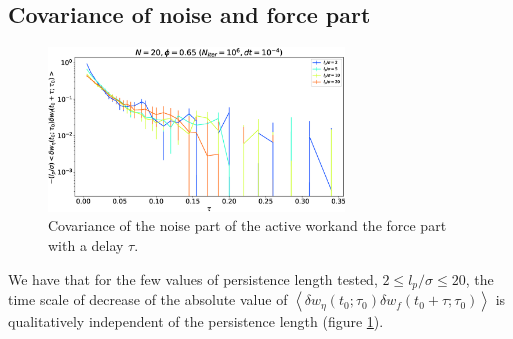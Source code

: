 \documentclass[10pt]{article}
\begin{document}
\subsection{Covariance of noise and force part}

\begin{figure}[H]
\centering
\includegraphics[width=0.7\textwidth]{crossCorNoiseForce_No1000_Dk6500_Em2000.eps}
\caption{Covariance of the noise part of the active workand the force part with a delay $\tau$.}
\label{crossCorNoiseForce}
\end{figure}

We have that for the few values of persistence length tested, $2 \leq l_p/\sigma \leq 20$, the time scale of decrease of the absolute value of $\left<\delta w_{\eta}(t_0; \tau_0) \delta w_f(t_0 + \tau; \tau_0)\right>$ is qualitatively independent of the persistence length (figure \ref{crossCorNoiseForce}).\\
\end{document}
